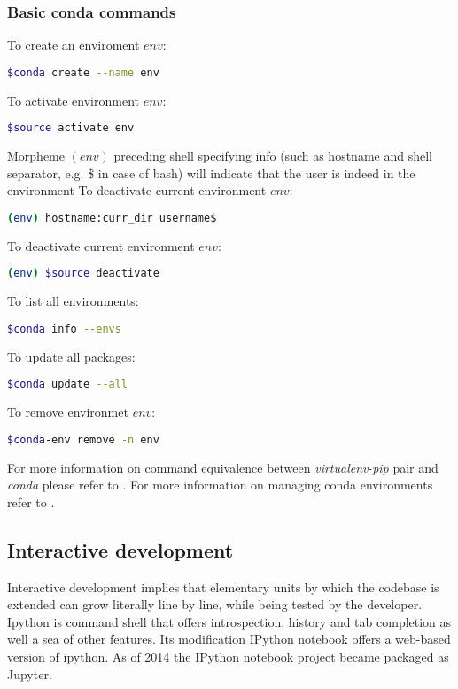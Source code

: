 \documentclass[article]{revtex4}
\begin{document}
\subsubsection{Basic conda commands}

\noindent To create an enviroment $env$:
\begin{lstlisting}[language=bash]
$conda create --name env
\end{lstlisting}

\noindent To activate environment $env$:
\begin{lstlisting}[language=bash]
$source activate env
\end{lstlisting}

Morpheme $(env)$ preceding shell specifying info  (such as hostname and shell separator, e.g. \$ in case of bash) will indicate that the user is indeed in the environment
\noindent To deactivate current environment $env$:
\begin{lstlisting}[language=bash]
(env) hostname:curr_dir username$
\end{lstlisting}

\noindent To deactivate current environment $env$:
\begin{lstlisting}[language=bash]
(env) $source deactivate
\end{lstlisting}

\noindent To list all environments:
\begin{lstlisting}[language=bash]
$conda info --envs
\end{lstlisting}

\noindent To update all packages:
\begin{lstlisting}[language=bash]
$conda update --all
\end{lstlisting}

\noindent To remove environmet $env$:
\begin{lstlisting}[language=bash]
$conda-env remove -n env
\end{lstlisting}

For more information on command equivalence between {\it virtualenv}-{\it pip} pair and {\it conda} please refer to \cite{cmp-venv-conda}.
For more information on managing conda environments refer to \cite{conda}.

\subsection{Interactive development}
Interactive development implies that elementary units by which the codebase is extended can grow literally line by line, while being tested by the developer.
Ipython is command shell that offers introspection, history and tab completion as well a sea of other features. Its modification IPython notebook offers a web-based version of ipython. As of 2014 the IPython notebook project became packaged as Jupyter.
\end{document}

